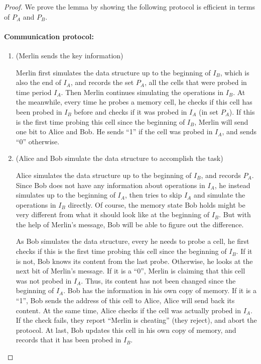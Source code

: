 \documentclass[11pt]{article}
\begin{document}
\begin{proof}

We prove the lemma by showing the following protocol is efficient in terms of $P_A$ and $P_B$. 

\paragraph*{Communication protocol:}

\begin{enumerate}[Step 1:]
	\setcounter{enumi}{0}
	\item
		(Merlin sends the key information)
		
		Merlin first simulates the data structure up to the beginning of $I_B$, which is also the end of $I_A$, and records the set $P_A$, all the cells that were probed in time period $I_A$. Then Merlin continues simulating the operations in $I_B$. At the meanwhile, every time he probes a memory cell, he checks if this cell has been probed in $I_B$ before and checks if it was probed in $I_A$ (in set $P_A$). If this is the first time probing this cell since the beginning of $I_B$, Merlin will send one bit to Alice and Bob. He sends ``1'' if the cell was probed in $I_A$, and sends ``0'' otherwise.
		
\item
		(Alice and Bob simulate the data structure to accomplish the task)
		
		Alice simulates the data structure up to the beginning of $I_B$, and records $P_A$. Since Bob does not have any information about operations in $I_A$, he instead simulates up to the beginning of $I_A$, then tries to skip $I_A$ and simulate the operations in $I_B$ directly. Of course, the memory state Bob holds might be very different from what it should look like at the beginning of $I_B$. But with the help of Merlin's message, Bob will be able to figure out the difference. 
		
		As Bob simulates the data structure, every he needs to probe a cell, he first checks if this is the first time probing this cell since the beginning of $I_B$. If it is not, Bob knows its content from the last probe. Otherwise, he looks at the next bit of Merlin's message. If it is a ``0'', Merlin is claiming that this cell was not probed in $I_A$. Thus, its content has not been changed since the beginning of $I_A$. Bob has the information in his own copy of memory. If it is a ``1'', Bob sends the address of this cell to Alice, Alice will send back its content. At the same time, Alice checks if the cell was actually probed in $I_A$. If the check fails, they report ``Merlin is cheating'' (they reject), and abort the protocol. At last, Bob updates this cell in his own copy of memory, and records that it has been probed in $I_B$. 
		

\end{enumerate}
\end{proof}
\end{document}
